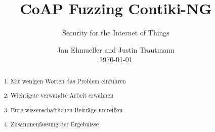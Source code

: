 \documentclass[sigconf]{acmart}
\begin{document}
\title{CoAP Fuzzing Contiki-NG}
\subtitle{Security for the Internet of Things}

\author{Jan Ehmueller and Justin Trautmann \\ \today}

\begin{abstract}
\begin{enumerate}
	\item Mit wenigen Worten das Problem einführen
	\item Wichtigste verwandte Arbeit erwähnen
	\item Eure wissenschaftlichen Beiträge umreißen
	\item Zusammenfassung der Ergebnisse
\end{enumerate}
\end{abstract}

\maketitle

\glsresetall









\balance



\end{document}
